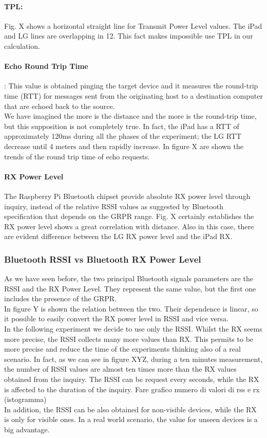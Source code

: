 \paragraph{TPL:} 
Fig. X shows a horizontal straight line for Transmit Power Level values. The iPad and LG lines are overlapping in 12. This fact makes impossible use TPL in our calculation.
\paragraph{Echo Round Trip Time}: This value is obtained pinging the target device and it measures the round-trip time (RTT) for messages sent from the originating host to a destination computer that are echoed back to the source.\\
We have imagined the more is the distance and the more is the round-trip time, but this supposition is not completely true. In fact, the iPad has a RTT of approximately 120ms during all the phases of the experiment; the LG RTT decrease until 4 meters and then rapidly increase. In figure X are shown the trends of the round trip time of echo requests.
\paragraph{RX Power Level}
The Raspberry Pi Bluetooth chipset provide absolute RX power level through inquiry, instead of the relative RSSI values as suggested by Bluetooth specification that depends on the GRPR range. Fig. X certainly establishes the RX power level shows a great correlation with distance. Also in this case, there are evident difference between the LG RX power level and the iPad RX.

\subsubsection{Bluetooth RSSI vs Bluetooth RX Power Level}
As we have seen before, the two principal Bluetooth signals parameters are the RSSI and the RX Power Level. 
They represent the same value, but the first one includes the presence of the GRPR. \\
In figure Y is shown the relation between the two. Their dependence is linear, so it possible to easily convert the RX power level in RSSI  and vice versa.\\
In the following experiment we decide to use only the RSSI. Whilst the RX seems more precise, the RSSI collects many more values than RX. This permits to be more precise and reduce the time of the experiments thinking also of a real scenario. In fact, as we can see in figure XYZ,  during a ten minutes measurement, the number of RSSI values are almost ten times more than the RX values obtained from the inquiry. The RSSI can be request every seconds, while the RX is affected to the duration of the inquiry. 
Fare grafico numero di valori di rss e rx (istogramma)\\
In addition, the RSSI can be also obtained for non-visible devices, while the RX is only for visible ones. In a real world scenario, the value for unseen devices is a big advantage.

